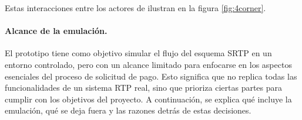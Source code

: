 Estas interacciones entre los actores de ilustran en la figura \ref{fig:4corner}.

\paragraph{Alcance de la emulación.}  

El prototipo tiene como objetivo simular el flujo del esquema SRTP en un entorno controlado, pero con un alcance limitado para enfocarse en los aspectos esenciales del proceso de solicitud de pago. Esto significa que no replica todas las funcionalidades de un sistema RTP real, sino que prioriza ciertas partes para cumplir con los objetivos del proyecto. A continuación, se explica qué incluye la emulación, qué se deja fuera y las razones detrás de estas decisiones.

